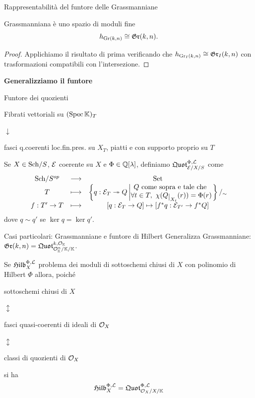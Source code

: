 \documentclass[a4paper]{beamer}
\begin{document}
\begin{frame}{Rappresentabilit\`a del funtore delle Grassmanniane}
\begin{alertblock}{Grassmanniana \`e uno spazio di moduli fine}
\[h_{\mathrm{Gr}(k,n)}\cong \mathfrak{Gr}(k,n).\]
\end{alertblock}
\begin{proof}
Applichiamo il risultato di prima verificando che $h_{\mathrm{Gr}_I(k,n)}\cong \mathfrak{Gr}_I(k,n)$ con trasformazioni compatibili con l'intersezione.
\end{proof}
\end{frame}

\begin{frame}{}
\begin{center}
{\huge \textbf{Generalizziamo il funtore} }
\end{center}
\end{frame}

\begin{frame}{Funtore dei quozienti}
\begin{center}
Fibrati vettoriali su $(\mathrm{Spec}\,\mathbb{K})_T$ 

$\downarrow$ 

fasci q.coerenti loc.fin.pres. su $X_T$, piatti e con supporto proprio su $T$
\end{center}
\pause

Se $X\in{\mathrm{Sch}}/{S}$, $\mathcal{E}$ coerente su $X$ e $\Phi\in \mathbb{Q}[\lambda]$, definiamo $\mathfrak{Quot}^{\Phi,\mathcal{L}}_{\mathcal{E}/X/S}$ come
\[\functorDef{\Sch S\op}{\Set}{T}{\cpa{q:\Ec_T\onto Q\left| \emat{Q\text{ come sopra e tale che }\\\forall t\in T,\ \chi(Q\res{X_t}(r))=\Phi(r)}\right.}/_\sim}{f:T'\to T}{[q:\Ec_T\to Q]\mapsto [f^\ast q:\Ec_{T'}\to f^\ast Q]}\]
dove $q\sim q'$ se $\ker q=\ker q'$.
\end{frame}

\begin{frame}{Casi particolari: Grassmanniane e funtore di Hilbert}
Generalizza Grassmanniane: $\mathfrak{Gr}(k,n)=\mathfrak{Quot}^{k,\mathcal{O}_{\mathbb{K}}}_{\mathcal{O}_{\mathbb{K}}^n/\mathbb{K}/\mathbb{K}}$.\pause
\bigskip

Se $\mathfrak{Hilb}^{\Phi,\mathcal{L}}_X$ problema dei moduli di sottoschemi chiusi di $X$ con polinomio di Hilbert $\Phi$ allora, poich\'e
\begin{center}
sottoschemi chiusi di $X$ 

$\updownarrow$ 

fasci quasi-coerenti di ideali di $\mathcal{O}_X$ 

$\updownarrow$ 

classi di quozienti di $\mathcal{O}_X$
\end{center}
si ha
\[\mathfrak{Hilb}^{\Phi,\mathcal{L}}_X=\mathfrak{Quot}^{\Phi,\mathcal{L}}_{\mathcal{O}_X/X/\mathbb{K}}\]

\end{frame}
\end{document}
